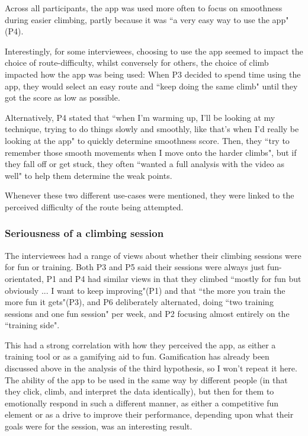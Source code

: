 Across all participants, the app was used more often to focus on smoothness during easier climbing, partly because it was ``a very easy way to use the app"(P4).

Interestingly, for some interviewees, choosing to use the app seemed to impact the choice of route-difficulty, whilst conversely for others, the choice of climb impacted how the app was being used:
When P3 decided to spend time using the app, they would select an easy route and ``keep doing the same climb" until they got the score as low as possible.

Alternatively, P4 stated that ``when I'm warming up, I'll be looking at my technique, trying to do things slowly and smoothly, like that's when I'd really be looking at the app" to quickly determine smoothness score.
Then, they ``try to remember those smooth movements when I move onto the harder climbs", but if they fall off or get stuck, they often ``wanted a full analysis with the video as well" to help them determine the weak points.

Whenever these two different use-cases were mentioned, they were linked to the perceived difficulty of the route being attempted.



\subsubsection{Seriousness of a climbing session}   
The interviewees had a range of views about whether their climbing sessions were for fun or training. 
Both P3 and P5 said their sessions were always just fun-orientated, 
P1 and P4 had similar views in that they climbed ``mostly for fun but obviously ... I want to keep improving"(P1) and that ``the more you train the more fun it gets"(P3), and P6 deliberately alternated, doing ``two training sessions and one fun session" per week, and P2 focusing almost entirely on the ``training side".

This had a strong correlation with how they perceived the app, as either a training tool or as a gamifying aid to fun. 
Gamification has already been discussed above in the analysis of the third hypothesis, so I won't repeat it here.
The ability of the app to be used in the same way by different people (in that they click, climb, and interpret the data identically), but then for them to emotionally respond in such a different manner, as either a competitive fun element or as a drive to improve their performance, depending upon what their goals were for the session, was an interesting result.


